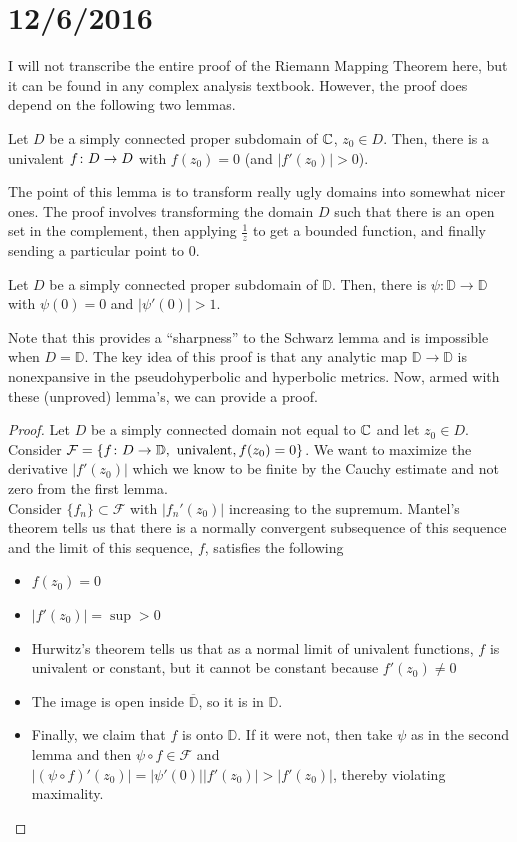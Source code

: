 \documentclass[11pt,leqno,oneside]{amsart}
\numberwithin{thm}{section}
\newcommand{\D}{\mathbb{D}}
\begin{document}
  \section{12/6/2016}
  I will not transcribe the entire proof of the Riemann Mapping Theorem here,
  but it can be found in any complex analysis textbook. However, the
  proof does depend on the following two lemmas.
  \begin{lem}
    Let $D$ be a simply connected proper subdomain of ${\mathbb C}$, $z_0 \in
    D$. Then, there is a univalent $f\colon D \to D$ with $f(z_0) = 0$ (and
    $|f'(z_0)| > 0$).
  \end{lem}
  The point of this lemma is to transform really ugly domains into
  somewhat nicer ones. The proof involves transforming the domain $D$
  such that there is an open set in the complement, then applying
  $\frac{1}{z}$ to get a bounded function, and finally sending a
  particular point to 0.
  \begin{lem}
    Let $D$ be a simply connected proper subdomain of $\D$. Then,
    there is $\psi: \D \to \D$ with $\psi(0) = 0$ and $|\psi'(0)| > 1$.
  \end{lem}
  Note that this provides a ``sharpness'' to the Schwarz lemma and is
  impossible when $D = \D$. The key idea of this proof is that any
  analytic map $\D \to \D$ is nonexpansive in the pseudohyperbolic and
  hyperbolic metrics. Now, armed with these (unproved) lemma's, we can
  provide a proof.
  \begin{proof}
    Let $D$ be a simply connected domain not equal to ${\mathbb C}$ and let
    $z_0 \in D$. Consider $\mathcal{F} = \{f\from D \to \D, \text{
      univalent}, f(z_0) = 0\}$. We want to maximize the derivative
    $|f'(z_0)|$ which we know to be finite by the Cauchy estimate and
    not zero from the first lemma. \\

    Consider $\{f_n\} \subset \mathcal{F}$ with $|f_n'(z_0)|$
    increasing to the supremum. Mantel's theorem tells us that there
    is a normally convergent subsequence of this sequence and the
    limit of this sequence, $f$, satisfies the following
    \begin{itemize}
    \item $f(z_0) = 0$
    \item $|f'(z_0)| = \sup > 0$
    \item Hurwitz's theorem tells us that as a normal limit of
      univalent functions, $f$ is univalent or constant, but it cannot
      be constant because $f'(z_0) \neq 0$
    \item The image is open inside $\overline{\D}$, so it is in $\D$.
    \item Finally, we claim that $f$ is onto $\D$. If it were not,
      then take $\psi$ as in the second lemma and then $\psi \circ f
      \in \mathcal{F}$ and $|(\psi \circ f)'(z_0)| =
      |\psi'(0)||f'(z_0)| > |f'(z_0)|$, thereby violating maximality.
    \end{itemize}
  \end{proof}
\end{document}
